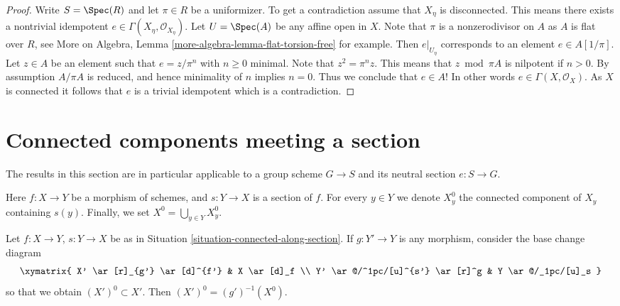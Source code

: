 \begin{proof}
Write $S = \Spec(R)$ and let $\pi \in R$ be a uniformizer.
To get a contradiction assume that $X_\eta$ is disconnected.
This means there exists a nontrivial idempotent
$e \in \Gamma(X_\eta, \mathcal{O}_{X_\eta})$.
Let $U = \Spec(A)$ be any affine open in $X$.
Note that $\pi$ is a nonzerodivisor on $A$ as $A$ is flat over $R$, see
More on Algebra, Lemma \ref{more-algebra-lemma-flat-torsion-free}
for example. Then $e|_{U_\eta}$ corresponds to an element $e \in A[1/\pi]$.
Let $z \in A$ be an element such that $e = z/\pi^n$ with $n \geq 0$ minimal.
Note that $z^2 = \pi^nz$. This means that $z \bmod \pi A$ is nilpotent
if $n > 0$. By assumption $A/\pi A$ is reduced, and hence minimality of
$n$ implies $n = 0$. Thus we conclude that $e \in A$! In other words
$e \in \Gamma(X, \mathcal{O}_X)$. As $X$ is connected it follows
that $e$ is a trivial idempotent which is a contradiction.
\end{proof}







\section{Connected components meeting a section}
\label{section-connected-components}

\noindent
The results in this section are in particular applicable to a group scheme
$G \to S$ and its neutral section $e : S \to G$.

\begin{situation}
\label{situation-connected-along-section}
Here $f : X \to Y$ be a morphism of schemes, and
$s : Y \to X$ is a section of $f$.
For every $y \in Y$ we denote $X^0_y$ the connected component of $X_y$
containing $s(y)$. Finally, we set $X^0 = \bigcup_{y \in Y} X^0_y$.
\end{situation}

\begin{lemma}
\label{lemma-base-change-connected-along-section}
Let $f : X \to Y$, $s : Y \to X$ be as in
Situation \ref{situation-connected-along-section}.
If $g : Y' \to Y$ is any morphism, consider the base change diagram
$$
\xymatrix{
X' \ar[r]_{g'} \ar[d]^{f'} & X \ar[d]_f \\
Y' \ar@/^1pc/[u]^{s'} \ar[r]^g & Y \ar@/_1pc/[u]_s
}
$$
so that we obtain $(X')^0 \subset X'$.
Then $(X')^0 = (g')^{-1}(X^0)$.
\end{lemma}

